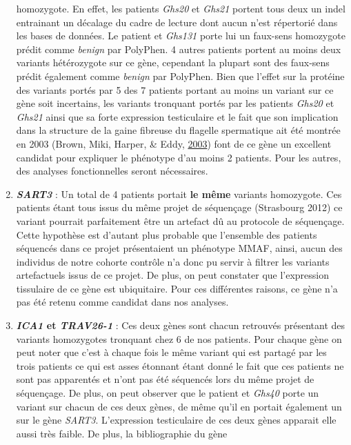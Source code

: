 \documentclass[12pt,twoside]{reedthesis}
\theoremstyle{definition}
\theoremstyle{definition}
\theoremstyle{remark}
\begin{document}
\begin{enumerate}
    homozygote. En effet, les patients \emph{Ghs20} et \emph{Ghs21}
    portent tous deux un indel entrainant un décalage du cadre de lecture
    dont aucun n'est répertorié dans les bases de données. Le patient et
    \emph{Ghs131} porte lui un faux-sens homozygote prédit comme
    \emph{benign} par PolyPhen. 4 autres patients portent au moins deux
    variants hétérozygote sur ce gène, cependant la plupart sont des
    faux-sens prédit également comme \emph{benign} par PolyPhen. Bien que
    l'effet sur la protéine des variants portés par 5 des 7 patients
    portant au moins un variant sur ce gène soit incertains, les variants
    tronquant portés par les patients \emph{Ghs20} et \emph{Ghs21} ainsi
    que sa forte expression testiculaire et le fait que son implication
    dans la structure de la gaine fibreuse du flagelle spermatique ait été
    montrée en 2003 (Brown, Miki, Harper, \& Eddy,
    \protect\hyperlink{ref-Brown2003}{2003}) font de ce gène un excellent
    candidat pour expliquer le phénotype d'au moins 2 patients. Pour les
    autres, des analyses fonctionnelles seront nécessaires.
  \item
    \textbf{\emph{SART3}} : Un total de 4 patients portait \textbf{le
    même} variants homozygote. Ces patients étant tous issus du même
    projet de séquençage (Strasbourg 2012) ce variant pourrait
    parfaitement être un artefact dû au protocole de séquençage. Cette
    hypothèse est d'autant plus probable que l'ensemble des patients
    séquencés dans ce projet présentaient un phénotype MMAF, ainsi, aucun
    des individus de notre cohorte contrôle n'a donc pu servir à filtrer
    les variants artefactuels issus de ce projet. De plus, on peut
    constater que l'expression tissulaire de ce gène est ubiquitaire. Pour
    ces différentes raisons, ce gène n'a pas été retenu comme candidat
    dans nos analyses.
  \item
    \textbf{\emph{ICA1} et \emph{TRAV26-1}} : Ces deux gènes sont chacun
    retrouvés présentant des variants homozygotes tronquant chez 6 de nos
    patients. Pour chaque gène on peut noter que c'est à chaque fois le
    même variant qui est partagé par les trois patients ce qui est asses
    étonnant étant donné le fait que ces patients ne sont pas apparentés
    et n'ont pas été séquencés lors du même projet de séquençage. De plus,
    on peut observer que le patient et \emph{Ghs40} porte un variant sur
    chacun de ces deux gènes, de même qu'il en portait également un sur le
    gène \emph{SART3}. L'expression testiculaire de ces deux gènes
    apparait elle aussi très faible. De plus, la bibliographie du gène

\end{enumerate}
\end{document}
